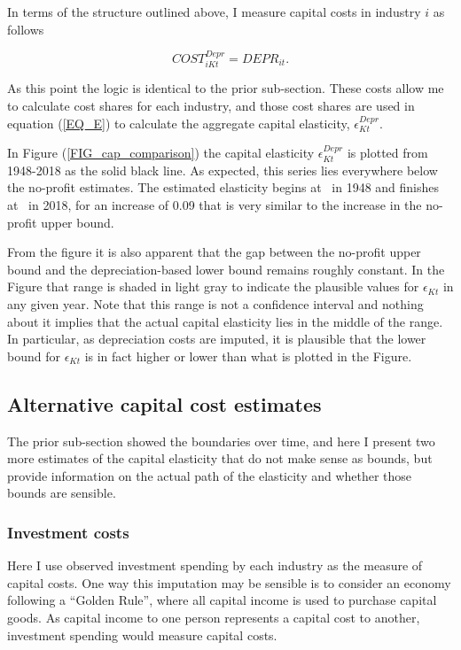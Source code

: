 \documentclass[11pt]{article}
\begin{document}
In terms of the structure outlined above, I measure capital costs in industry $i$ as follows

\begin{equation}
	COST^{Depr}_{iKt} = DEPR_{it}. 
\end{equation}

As this point the logic is identical to the prior sub-section. These costs allow me to calculate cost shares for each industry, and those cost shares are used in equation (\ref{EQ_E}) to calculate the aggregate capital elasticity, $\epsilon_{Kt}^{Depr}$.

In Figure (\ref{FIG_cap_comparison}) the capital elasticity $\epsilon_{Kt}^{Depr}$ is plotted from 1948-2018 as the solid black line. As expected, this series lies everywhere below the no-profit estimates. The estimated elasticity begins at \basefirstdepr \ in 1948 and finishes at \baselastdepr \  in 2018, for an increase of 0.09 that is very similar to the increase in the no-profit upper bound. 

From the figure it is also apparent that the gap between the no-profit upper bound and the depreciation-based lower bound remains roughly constant. In the Figure that range is shaded in light gray to indicate the plausible values for $\epsilon_{Kt}$ in any given year. Note that this range is not a confidence interval and nothing about it implies that the actual capital elasticity lies in the middle of the range. In particular, as depreciation costs are imputed, it is plausible that the lower bound for $\epsilon_{Kt}$ is in fact higher or lower than what is plotted in the Figure.

\subsection{Alternative capital cost estimates}
The prior sub-section showed the boundaries over time, and here I present two more estimates of the capital elasticity that do not make sense as bounds, but provide information on the actual path of the elasticity and whether those bounds are sensible.

\subsubsection{Investment costs}
Here I use observed investment spending by each industry as the measure of capital costs. One way this imputation may be sensible is to consider an economy following a ``Golden Rule'', where all capital income is used to purchase capital goods. As capital income to one person represents a capital cost to another, investment spending would measure capital costs.
\end{document}
